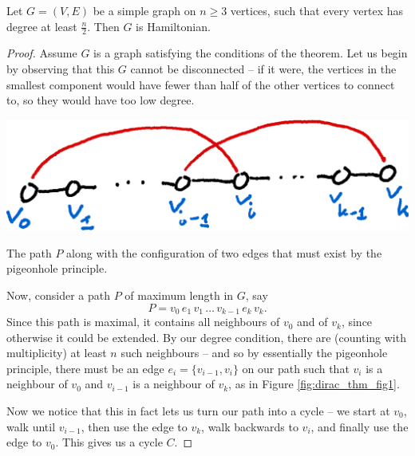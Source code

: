 \documentclass[nobib]{tufte-handout}
\begin{document}
\begin{theorem}
    Let $G = (V,E)$ be a simple graph on $n \geq 3$ vertices, such that every vertex has degree at least $\frac{n}{2}$. Then $G$ is Hamiltonian.

    \begin{proof}
        Assume $G$ is a graph satisfying the conditions of the theorem. Let us begin by observing that this $G$ cannot be disconnected -- if it were, the vertices in the smallest component would have fewer than half of the other vertices to connect to, so they would have too low degree.

        \begin{marginfigure}
            \centering
            \includegraphics[width=1.0\textwidth]{graphics/L8_vx_covers_hamiltonicity_etc/diracs_thm_fig1.png}
            \caption{The path $P$ along with the configuration of two edges that must exist by the pigeonhole principle.}
            \label{fig:dirac_thm_fig1}
        \end{marginfigure}

        Now, consider a path $P$ of maximum length in $G$, say
        $$P = v_0\,e_1\,v_1\,\ldots\,v_{k-1}\,e_k\,v_k.$$
        Since this path is maximal, it contains all neighbours of $v_0$ and of $v_k$, since otherwise it could be extended. By our degree condition, there are (counting with multiplicity) at least $n$ such neighbours -- and so by essentially the pigeonhole principle, there must be an edge $e_i = \{v_{i-1},v_i\}$ on our path such that $v_i$ is a neighbour of $v_0$ and $v_{i-1}$ is a neighbour of $v_k$, as in Figure \ref{fig:dirac_thm_fig1}.

        Now we notice that this in fact lets us turn our path into a cycle -- we start at $v_0$, walk until $v_{i-1}$, then use the edge to $v_k$, walk backwards to $v_i$, and finally use the edge to $v_0$. This gives us a cycle $C$.


\end{proof}
\end{theorem}
\end{document}
